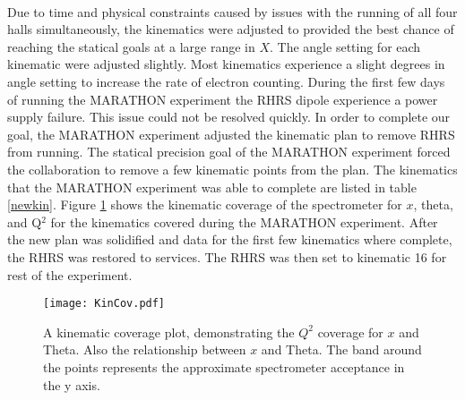 \paragraph{}Due to time and physical constraints caused by issues with the running of all four halls simultaneously, the kinematics were adjusted to provided the best chance of reaching the statical goals at a large range in $X$. The angle setting for each kinematic were adjusted slightly. Most kinematics experience a slight degrees in angle setting to increase the rate of electron counting. During the first few days of running the MARATHON experiment the RHRS dipole experience a power supply failure. This issue could not be resolved quickly. In order to complete our goal, the MARATHON experiment adjusted the kinematic plan to remove RHRS from running. The statical precision goal of the MARATHON experiment forced the collaboration to remove a few kinematic points from the plan. The kinematics that the MARATHON experiment was able to complete are listed in table \ref{newkin}. Figure \ref{fig:kincov} shows the kinematic coverage of the spectrometer for $x$, theta, and Q$^2$ for the kinematics covered during the MARATHON experiment. After the new plan was solidified and data for the first few kinematics where complete, the RHRS was restored to services. The RHRS was then set to kinematic 16 for rest of the experiment.      

\begin{figure}[t!]
	\centering
	\texttt{[image: KinCov.pdf]}
	\caption{A kinematic coverage plot, demonstrating the $Q^2$ coverage for $x$ and Theta. Also the relationship between $x$ and Theta. The band around the points represents the approximate spectrometer acceptance in the y axis.}
	\label{fig:kincov}
\end{figure}